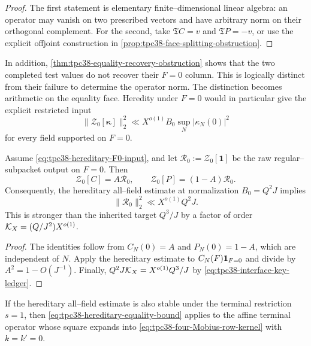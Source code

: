 \begin{proof}
The first statement is elementary finite--dimensional linear algebra: an
operator may vanish on two prescribed vectors and have arbitrary norm on
their orthogonal complement.  For the second, take
\(\mathfrak T C=v\) and \(\mathfrak T P=-v\), or use the explicit
offjoint construction in
\cref{prop:tpc38-face-splitting-obstruction}.
\end{proof}

In addition, \cref{thm:tpc38-equality-recovery-obstruction} shows that the
two completed test values do not recover their \(F=0\) column.  This is
logically distinct from their failure to determine the operator norm.
The distinction becomes arithmetic on the equality face.  Heredity under
\(F=0\) would in particular give the explicit restricted input
\begin{equation}
 \|\mathscr Z_0[\boldsymbol\kappa]\|_2^2
 \ll X^{o(1)}B_0\sup_N|\kappa_N(0)|^2
 \label{eq:tpc38-hereditary-F0-input}
\end{equation}
for every field supported on \(F=0\).

\begin{theorem}
\label{thm:tpc38-equality-face-embedding}
Assume \eqref{eq:tpc38-hereditary-F0-input}, and let
\(\mathscr R_0:=\mathscr Z_0[\mathbf1]\) be the raw regular--subpacket
output on \(F=0\).  Then
\begin{equation}
 \boxed{
 \mathscr Z_0[C]=A\mathscr R_0,
 \qquad
 \mathscr Z_0[P]=(1-A)\mathscr R_0.}
 \label{eq:tpc38-equality-face-embedding}
\end{equation}
Consequently, the hereditary all--field estimate at normalization
\(B_0=Q^2J\) implies
\begin{equation}
 \|\mathscr R_0\|_2^2\ll X^{o(1)}Q^2J.
 \label{eq:tpc38-hereditary-equality-bound}
\end{equation}
This is stronger than the inherited target \(Q^3/J\) by a factor of order
\(\mathcal K_X=(Q/J^2)X^{o(1)}\).
\end{theorem}

\begin{proof}
The identities follow from \(C_N(0)=A\) and \(P_N(0)=1-A\), which are
independent of \(N\).  Apply the hereditary estimate to
\(C_N(F)\mathbf 1_{F=0}\) and divide by \(A^2=1-O(J^{-1})\).  Finally,
\(Q^2J\mathcal K_X=X^{o(1)}Q^3/J\) by
\eqref{eq:tpc38-interface-key-ledger}.
\end{proof}

If the hereditary all--field estimate is also stable under the terminal restriction
\(s=1\), then \eqref{eq:tpc38-hereditary-equality-bound} applies to the
affine terminal operator whose square expands into
\eqref{eq:tpc38-four-Mobius-row-kernel} with \(k=k'=0\).

